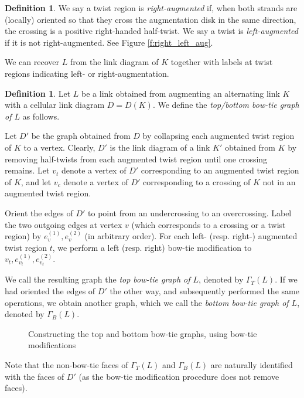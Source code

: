 \documentclass[11pt]{amsart}
\theoremstyle{plain}
\theoremstyle{definition}
\newtheorem{define}[theorem]{Definition}
\newtheorem{definition}[theorem]{Definition}
\begin{document}
\begin{define}
We say a twist region is \emph{right-augmented} if, when both strands are
(locally) oriented so that they cross the augmentation disk in the same
direction, the crossing is a positive right-handed half-twist.
We say a twist is \emph{left-augmented} if it is not right-augmented.
See Figure \ref{f:right_left_aug}.
\end{define}


We can recover $L$ from the link diagram of $K$
together with labels at twist regions indicating left- or right-augmentation.

\begin{definition}
\label{d:tori-decomp-graph}
Let $L$ be a link obtained from augmenting an alternating link $K$
with a cellular link diagram $D = D(K)$.
We define the \emph{top/bottom bow-tie graph of $L$} as follows.


Let $D'$ be the graph obtained from $D$
by collapsing each augmented twist region of $K$ to a vertex.
Clearly, $D'$ is the link diagram of a link $K'$
obtained from $K$ by removing half-twists from each augmented twist region
until one crossing remains.
Let $v_t$ denote a vertex of $D'$ corresponding to
an augmented twist region of $K$,
and let $v_c$ denote a vertex of $D'$ corresponding to
a crossing of $K$ not in an augmented twist region.


Orient the edges of $D'$ to point from an undercrossing
to an overcrossing.
Label the two outgoing edges at vertex $v$
(which corresponds to a crossing or a twist region)
by $e_v^{(1)}, e_v^{(2)}$ (in arbitrary order).
For each left- (resp. right-) augmented twist region $t$,
we perform a left (resp. right) bow-tie modification to
$v_t, e_{v_t}^{(1)}, e_{v_t}^{(2)}$.


We call the resulting graph the \emph{top bow-tie graph of $L$},
denoted by $\Gamma_T(L)$.
If we had oriented the edges of $D'$ the other way,
and subsequently performed the same operations,
we obtain another graph,
which we call the \emph{bottom bow-tie graph of $L$},
denoted by $\Gamma_B(L)$.
\end{definition}

\begin{figure}[ht]

\caption{Constructing the top and bottom bow-tie graphs,
using bow-tie modifications}
\label{f:tori-decomp-graph}
\end{figure}

Note that the non-bow-tie faces of $\Gamma_T(L)$ and $\Gamma_B(L)$
are naturally identified with the faces of $D'$
(as the bow-tie modification procedure does not remove faces).
\end{document}
